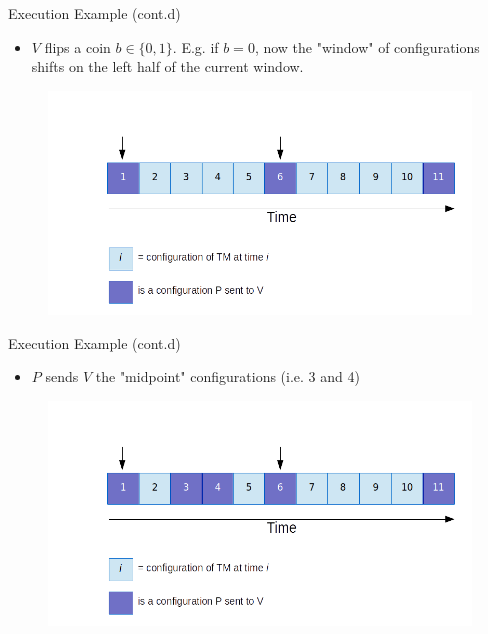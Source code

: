 \begin{frame}{Execution Example (cont.d)}
	\begin{itemize}
		\item $V$ flips a coin $b \in \{ 0,1 \}$. E.g. if $b = 0$, now the "window" of configurations shifts on the left half of the current window.
	\end{itemize}
	\begin{figure}
		
		\includegraphics[scale=0.4]{pics/r2bis.png}
	\end{figure}
\end{frame}

\begin{frame}{Execution Example (cont.d)}
	\begin{itemize}
		\item $P$ sends $V$ the "midpoint" configurations (i.e. 3 and 4)
	\end{itemize}
	\begin{figure}
		\includegraphics[scale=0.4]{pics/r3.png}
	\end{figure}
\end{frame}


